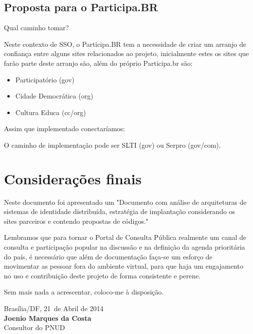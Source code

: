 \documentclass[11pt]{article}
\newcommand{\MyName}{Joenio Marques da Costa}
\newcommand{\ProductDescription}{"Documento com análise de arquiteturas de
        sistemas de identidade distribuída, estratégia de implantação
        considerando os sites parceiros e contendo propostas de códigos."
}
\newcommand{\MesEntrega}{Abril de 2014}
\newcommand{\DiaEntrega}{21}
\begin{document}
\subsection{Proposta para o Participa.BR}

Qual caminho tomar?

Neste contexto de SSO, o Participa.BR tem a necessidade de criar um
arranjo de confiança entre alguns sites relacionados ao projeto, inicialmente
estes os sites que farão parte deste arranjo são, além do próprio Participa.br
são:

\begin{itemize}
  \item{Participatório (gov)}
  \item{Cidade Democrática (org)}
  \item{Cultura Educa (cc/org)}
\end{itemize}

Assim que implementado conectaríamos:

O caminho de implementação pode ser SLTI (gov) ou Serpro (gov/com).

\section{Considerações finais}

Neste documento foi apresentado um \ProductDescription

Lembramos que para tornar o Portal de Consulta Pública realmente um canal de
consulta e participação popular na discussão e na definição da agenda
prioritária do país, é necessário que além de documentação faça-se um esforço
de movimentar as pessoar fora do ambiente virtual, para que haja um
engajamento no uso e contribuição deste projeto de forma consistente e perene.

\vspace{1cm}

Sem mais nada a acrescentar, coloco-me à disposição.

\vspace{1cm}

\begin{minipage}{\textwidth}
  Brasília/DF, \DiaEntrega \ de \MesEntrega\\[1cm]
  \textbf{\MyName}\\
  \small Consultor do PNUD
\end{minipage}
\end{document}
